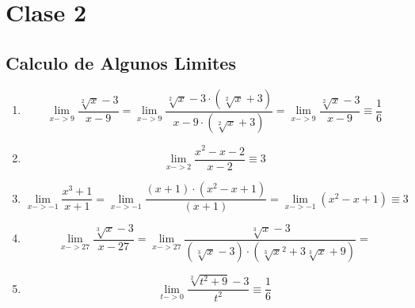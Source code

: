 \documentclass{article}
\begin{document}
\begin{enumerate}
            \end{enumerate}
        \section{Clase 2}
            \subsection{Calculo de Algunos Limites}
            \begin{enumerate}
                \item \begin{equation}
                    \lim_{x->9} \frac{\sqrt[2]{x}-3}{x-9} =
                    \lim_{x->9} \frac{\sqrt[2]{x}-3 \cdot (\sqrt[2]{x} +3)}{x-9 \cdot (\sqrt[2]{x} +3)}  =
                    \lim_{x->9} \frac{\sqrt[2]{x}-3}{x-9} \equiv \frac{1}{6}
                \end{equation}
                \item \begin{equation} \lim_{x->2} \frac{x^2-x-2}{x-2} \equiv 3
                \end{equation}
                \item \begin{equation}
                    \lim_{x->-1} \frac{x^3 +1}{x+1} = 
                    \lim_{x->-1} \frac{(x+1)\cdot (x^2-x+1)}{(x+1)}=
                    \lim_{x->-1} (x^2-x+1) \equiv 3
                \end{equation}
                \item  \begin{equation}
                    \lim_{x->27} \frac{\sqrt[3]{x}-3}{x-27} =
                    \lim_{x->27} \frac{\sqrt[3]{x}-3}{(\sqrt[3]{x}-3) \cdot (\sqrt[3]{x}^2 + 3\sqrt[3]{x}+9)} =
                \end{equation}
                \item  \begin{equation}
                    \lim_{t->0} \frac{\sqrt[2]{t^2 +9}-3}{t^2} \equiv \frac{1}{6}
                \end{equation}
            \end{enumerate}
\end{document}
